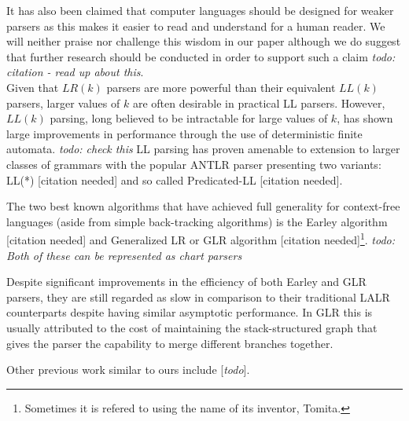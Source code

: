 \documentclass[a4paper,11pt]{article}
\begin{document}
It has also been claimed that computer languages should be designed for weaker parsers as this makes it easier to read and understand for a human reader.
We will neither praise nor challenge this wisdom in our paper although we do suggest that further research should be conducted in order to support such a claim \emph{todo: citation - read up about this}.\\

Given that $LR(k)$ parsers are more powerful than their equivalent $LL(k)$ parsers, larger values of $k$ are often desirable in practical LL parsers.
However, $LL(k)$ parsing, long believed to be intractable for large values of $k$, has shown large improvements in performance through the use of deterministic finite automata. \emph{todo: check this} 
LL parsing has proven amenable to extension to larger classes of grammars with the popular ANTLR parser presenting two variants: LL(*) [citation needed] and so called Predicated-LL \cite{} [citation needed].

The two best known algorithms that have achieved full generality for context-free languages (aside from simple back-tracking algorithms) is the Earley algorithm [citation needed] and Generalized LR or GLR algorithm [citation needed]\footnote{Sometimes it is refered to using the name of its inventor, Tomita.}.
\emph{todo: Both of these can be represented as chart parsers}

Despite significant improvements in the efficiency of both Earley and GLR parsers, they are still regarded as slow in comparison to their traditional LALR counterparts despite having similar asymptotic performance.
In GLR this is usually attributed to the cost of maintaining the stack-structured graph that gives the parser the capability to merge different branches together\cite{Mcpeak04elkhound:a}.

Other previous work similar to ours include \cite{1287949, Marc80, 991520, 146993, DBLP:conf/wia/GalvezSF06} [\emph{todo}].
\end{document}
